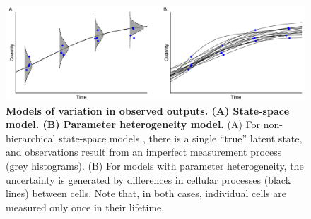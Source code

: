 \begin{figure}[H]
  \centerline{\includegraphics[width=\textwidth]{../figures/data_generation.pdf}}
  \caption{\textbf{Models of variation in observed outputs. (A) State-space model. (B) Parameter heterogeneity model.} (A) For non-hierarchical state-space models , there is a single ``true'' latent state, and observations result from an imperfect measurement process (grey histograms). (B) For models with parameter heterogeneity, the uncertainty is generated by differences in cellular processes (black lines) between cells. Note that, in both cases, individual cells are measured only once in their lifetime.}
  \label{fig:data_generation}
\end{figure}

